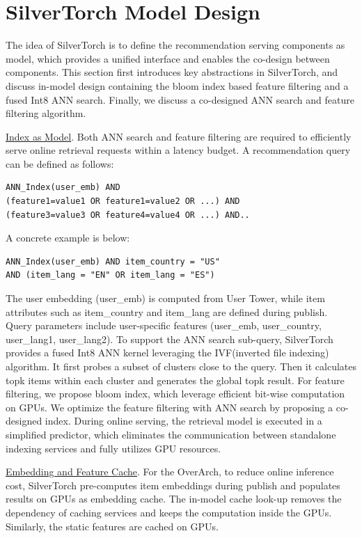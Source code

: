 \section{SilverTorch Model Design}
\label{sec:4}
The idea of SilverTorch is to define the recommendation serving components as model, which provides a unified interface and enables the co-design between components. This section first introduces key abstractions in SilverTorch, and discuss in-model design containing the bloom index based feature filtering and a fused Int8 ANN search. Finally, we discuss a co-designed ANN search and feature filtering algorithm.

\underline{Index as Model}. Both ANN search and feature filtering are required to efficiently serve online retrieval requests within a latency budget. A recommendation query can be defined as follows:
\begin{verbatim}
ANN_Index(user_emb) AND 
(feature1=value1 OR feature1=value2 OR ...) AND
(feature3=value3 OR feature4=value4 OR ...) AND..
\end{verbatim}
A concrete example is below:
\begin{verbatim}
ANN_Index(user_emb) AND item_country = "US"
AND (item_lang = "EN" OR item_lang = "ES")
\end{verbatim}
\noindent The user embedding (user\_emb) is computed from User Tower, while item attributes such as item\_country and item\_lang are defined during publish. Query parameters include user-specific features (user\_emb, user\_country, user\_lang1, user\_lang2). 
To support the ANN search sub-query, SilverTorch provides a fused Int8 ANN kernel leveraging the IVF(inverted file indexing) algorithm. It first probes a subset of clusters close to the query. Then it calculates topk items within each cluster and generates the global topk result.
For feature filtering, we propose bloom index, which leverage efficient bit-wise computation on GPUs. We optimize the feature filtering with ANN search by proposing a co-designed index.
During online serving, the retrieval model is executed in a simplified predictor, which eliminates the communication between standalone indexing services and fully utilizes GPU resources.

\underline{Embedding and Feature Cache}. For the OverArch, to reduce online inference cost, SilverTorch pre-computes item embeddings during publish and populates results on GPUs as embedding cache. The in-model cache look-up removes the dependency of caching services and keeps the computation inside the GPUs. Similarly, the static features are cached on GPUs.

